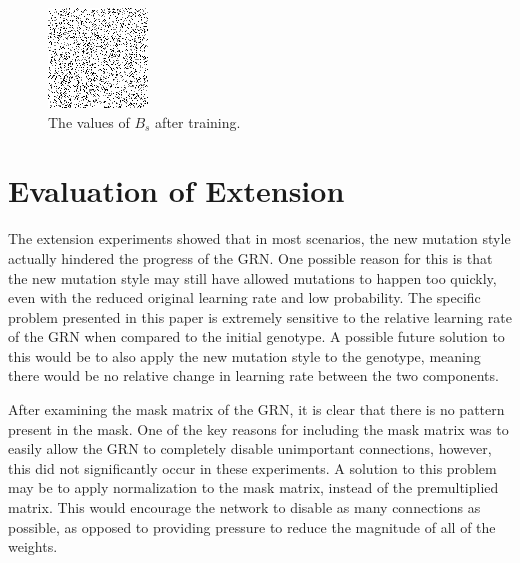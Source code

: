 \documentclass[twocolumn,a4paper,11pt]{article}
\begin{document}
    \begin{figure}[h]
        \centering
        \includegraphics[width=0.45\linewidth]{ex-img/masked_mask.png}
        \caption{The values of $B_s$ after training.} \label{fig:ex-mask}
    \end{figure}

    \section{Evaluation of Extension}
    The extension experiments showed that in most scenarios, the new mutation style actually hindered the progress of the GRN. One possible reason for this is that the new mutation style may still have allowed mutations to happen too quickly, even with the reduced original learning rate and low probability. The specific problem presented in this paper is extremely sensitive to the relative learning rate of the GRN when compared to the initial genotype. A possible future solution to this would be to also apply the new mutation style to the genotype, meaning there would be no relative change in learning rate between the two components.
    
    After examining the mask matrix of the GRN, it is clear that there is no pattern present in the mask. One of the key reasons for including the mask matrix was to easily allow the GRN to completely disable unimportant connections, however, this did not significantly occur in these experiments. A solution to this problem may be to apply normalization to the mask matrix, instead of the premultiplied matrix. This would encourage the network to disable as many connections as possible, as opposed to providing pressure to reduce the magnitude of all of the weights.
\end{document}
